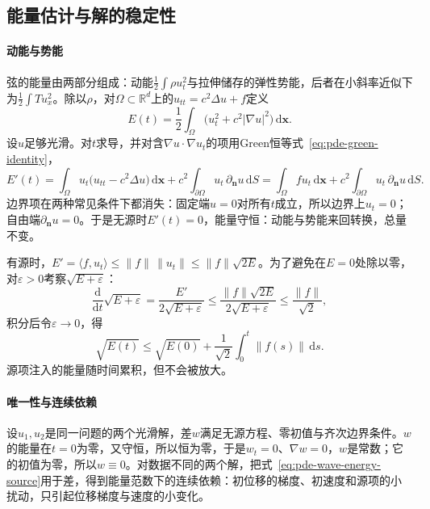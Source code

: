 \subsection{能量估计与解的稳定性}
\label{sec:pde-wave-energy}

\paragraph{动能与势能}
弦的能量由两部分组成：动能$\tfrac12\int\rho u_t^2$与拉伸储存的弹性势能，后者在小斜率近似下为$\tfrac12\int Tu_x^2$。除以$\rho$，对$\Omega\subset\mathbb R^d$上的$u_{tt}=c^2\Delta u+f$定义
\begin{equation}
  E(t)=\frac12\int_\Omega\bigl(u_t^2+c^2|\nabla u|^2\bigr)\,\mathrm d\bm x .
  \label{eq:pde-wave-energy}
\end{equation}
设$u$足够光滑。对$t$求导，并对含$\nabla u\cdot\nabla u_t$的项用Green恒等式~\eqref{eq:pde-green-identity}，
\[
  E'(t)=\int_\Omega u_t\bigl(u_{tt}-c^2\Delta u\bigr)\,\mathrm d\bm x+c^2\int_{\partial\Omega}u_t\,\partial_{\bm n}u\,\mathrm dS
  =\int_\Omega fu_t\,\mathrm d\bm x+c^2\int_{\partial\Omega}u_t\,\partial_{\bm n}u\,\mathrm dS .
\]
边界项在两种常见条件下都消失：固定端$u=0$对所有$t$成立，所以边界上$u_t=0$；自由端$\partial_{\bm n}u=0$。于是无源时$E'(t)=0$，能量守恒：动能与势能来回转换，总量不变。

有源时，$E'=\langle f,u_t\rangle\leq\|f\|\,\|u_t\|\leq\|f\|\sqrt{2E}$。为了避免在$E=0$处除以零，对$\varepsilon>0$考察$\sqrt{E+\varepsilon}$：
\[
  \frac{\mathrm d}{\mathrm dt}\sqrt{E+\varepsilon}=\frac{E'}{2\sqrt{E+\varepsilon}}\leq\frac{\|f\|\sqrt{2E}}{2\sqrt{E+\varepsilon}}\leq\frac{\|f\|}{\sqrt2},
\]
积分后令$\varepsilon\to0$，得
\begin{equation}
  \sqrt{E(t)}\leq\sqrt{E(0)}+\frac1{\sqrt2}\int_0^t\|f(s)\|\,\mathrm ds .
  \label{eq:pde-wave-energy-source}
\end{equation}
源项注入的能量随时间累积，但不会被放大。

\paragraph{唯一性与连续依赖}
设$u_1,u_2$是同一问题的两个光滑解，差$w$满足无源方程、零初值与齐次边界条件。$w$的能量在$t=0$为零，又守恒，所以恒为零，于是$w_t=0$、$\nabla w=0$，$w$是常数；它的初值为零，所以$w\equiv0$。对数据不同的两个解，把式~\eqref{eq:pde-wave-energy-source}用于差，得到能量范数下的连续依赖：初位移的梯度、初速度和源项的小扰动，只引起位移梯度与速度的小变化。

